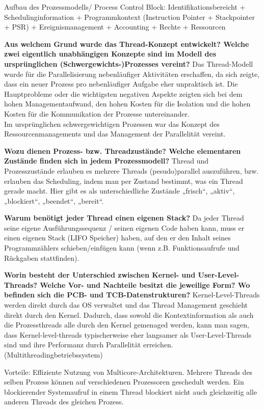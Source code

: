 \documentclass[a4paper]{article}
\begin{document}
\begin{itemize*}
    Aufbau des Prozessmodells/ Process Control Block: Identifikationsbereicht + Schedulinginformation + Programmkontext (Instruction Pointer + Stackpointer + PSR) + Ereignismanagement + Accounting + Rechte + Ressourcen
    \item \textbf{Aus welchem Grund wurde das Thread-Konzept entwickelt? Welche zwei eigentlich unabhängigen Konzepte sind im Modell des ursprünglichen (Schwergewichts-)Prozesses vereint?} Das Thread-Modell wurde für die Parallelisierung nebenläufiger Aktivitäten erschaffen, da sich zeigte, dass ein neuer Prozess pro nebenläufiger Aufgabe eher unpraktisch ist. Die Hauptprobleme oder die wichtigsten negativen Aspekte zeigten sich bei dem hohen Managementaufwand, den hohen Kosten für die Isolation und die hohen Kosten für die Kommunikation der Prozesse untereinander. \\
    Im ursprünglichen schwergewichtigen Prozessen war das Konzept des Ressourcenmanagements und das Management der Parallelität vereint.
    \item \textbf{Wozu dienen Prozess- bzw. Threadzustände? Welche elementaren Zustände finden sich in jedem Prozessmodell?} Thread und Prozesszustände erlauben es mehrere Threads (pesudo)parallel auszuführen, bzw. erlauben das Scheduling, indem man per Zustand bestimmt, was ein Thread gerade macht. Hier gibt es als unterschiedliche Zustände „frisch“, „aktiv“, „blockiert“, „beendet“, „bereit“.
    \item \textbf{Warum benötigt jeder Thread einen eigenen Stack?} Da jeder Thread seine eigene Ausführungssequenz / seinen eigenen Code haben kann, muss er einen eigenen Stack (LIFO Speicher) haben, auf den er den Inhalt seines Programmzählers schieben/einfügen kann (wenn z.B. Funktionsaufrufe und Rückgaben stattfinden).
    \item \textbf{Worin besteht der Unterschied zwischen Kernel- und User-Level-Threads? Welche Vor- und Nachteile besitzt die jeweilige Form? Wo befinden sich die PCB- und TCB-Datenstrukturen?} Kernel-Level-Threads werden direkt durch das OS verwaltet und das Thread Management geschieht direkt durch den Kernel. Dadurch, dass sowohl die Kontextinformation als auch die Prozessthreads alle durch den Kernel gemenaged werden, kann man sagen, dass Kernel-level-threads typischerweise eher langsamer als User-Level-Threads sind und ihre Performanz durch Parallelität erreichen. (Multithreadingbetriebssystem)\\
    \begin{itemize*}
        \item Vorteile: Effiziente Nutzung von Multicore-Architekturen. Mehrere Threads des selben Prozess können auf verschiedenen Prozessoren geschedult werden. Ein blockierender Systemaufruf in einem Thread blockiert nicht auch gleichzeitig alle anderen Threads des gleichen Prozess.

\end{itemize*}
\end{itemize*}
\end{document}
